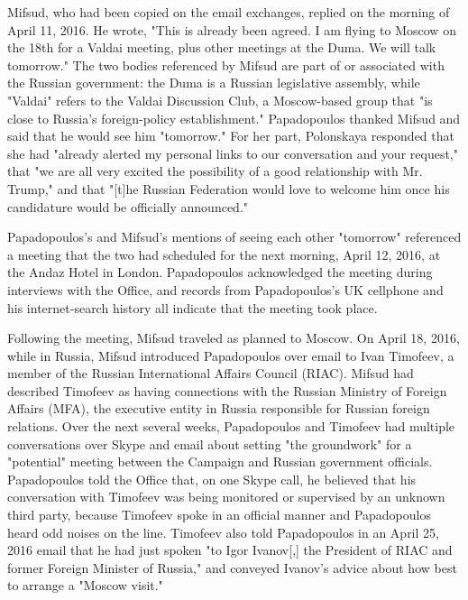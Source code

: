Mifsud, who had been copied on the email exchanges, replied on the morning of April 11, 2016.
He wrote, "This is already been agreed.
I am flying to Moscow on the 18th for a Valdai meeting, plus other meetings at the Duma.
We will talk tomorrow."%
The two bodies referenced by Mifsud are part of or associated with the Russian government: the Duma is a Russian legislative assembly,%
while "Valdai" refers to the Valdai Discussion Club, a Moscow-based group that "is close to Russia's foreign-policy establishment."%
Papadopoulos thanked Mifsud and said that he would see him "tomorrow."%
For her part, Polonskaya responded that she had "already alerted my personal links to our conversation and your request," that "we are all very excited the possibility of a good relationship with Mr. Trump," and that "[t]he Russian Federation would love to welcome him once his candidature would be officially announced."%

Papadopoulos's and Mifsud's mentions of seeing each other "tomorrow" referenced a meeting that the two had scheduled for the next morning, April 12, 2016, at the Andaz Hotel in London.
Papadopoulos acknowledged the meeting during interviews with the Office,%
and records from Papadopoulos's UK cellphone and his internet-search history all indicate that the meeting took place.%

Following the meeting, Mifsud traveled as planned to Moscow.%
On April 18, 2016, while in Russia, Mifsud introduced Papadopoulos over email to Ivan Timofeev, a member of the Russian International Affairs Council (RIAC).%
Mifsud had described Timofeev as having connections with the Russian Ministry of Foreign Affairs (MFA),%
the executive entity in Russia responsible for Russian foreign relations.%
Over the next several weeks, Papadopoulos and Timofeev had multiple conversations over Skype and email about setting "the groundwork" for a "potential" meeting between the Campaign and Russian government officials.%
Papadopoulos told the Office that, on one Skype call, he believed that his conversation with Timofeev was being monitored or supervised by an unknown third party, because Timofeev spoke in an official manner and Papadopoulos heard odd noises on the line.%
Timofeev also told Papadopoulos in an April 25, 2016 email that he had just spoken "to Igor Ivanov[,] the President of RIAC and former Foreign Minister of Russia," and conveyed Ivanov's advice about how best to arrange a "Moscow visit."%

